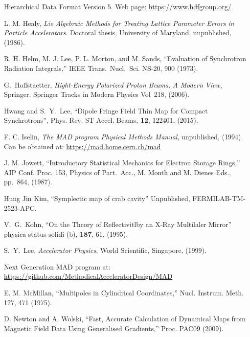 \begin{thebibliography}{XXXXXXX99}
Hierarchical Data Format Version 5. Web page:
\hfill\break
\hspace*{0.3in} \url{https://www.hdfgroup.org/}

L. M. Healy, {\it Lie Algebraic Methods for Treating Lattice Parameter
Errors in Particle Accelerators}. Doctoral thesis, University of
Maryland, unpublished, (1986).

R. H. Helm, M. J. Lee, P. L. Morton, and M. Sands, 
``Evaluation of Synchrotron Radiation Integrals,''
IEEE Trans.~Nucl.~Sci. NS-20, 900 (1973).

G.~Hoffstaetter, 
{\it Hight-Energy Polarized Proton Beams, A Modern View}, 
Springer. Springer Tracks in Modern Physics Vol~218, (2006).

Hwang and S.~Y.~Lee, 
``Dipole Fringe Field Thin Map for Compact Synchrotrons'',
Phys. Rev. ST Accel. Beams, {\bf 12}, 122401, (2015).

F. C. Iselin, 
{\it The MAD program Physical Methods Manual}, 
unpublished, (1994). Can be obtained at: 
\hfill\break
\hspace*{0.3in}
\url{https://mad.home.cern.ch/mad}

J. M. Jowett, 
``Introductory Statistical Mechanics for Electron Storage Rings,'' 
AIP Conf. Proc. 153, Physics of Part.\ Acc.,
M. Month and M. Dienes Eds., pp.~864, (1987).

Hung Jin Kim,
``Symplectic map of crab cavity''
Unpublished, FERMILAB-TM-2523-APC.

V.~G.~Kohn, 
``On the Thcory of Reflectivitlby an X-Ray Multilaler Mirror''
physica status solidi (b), {\bf 187}, 61, (1995).

S.~Y.~Lee,
{\it Accelerator Physics},
World Scientific, Singapore, (1999).

Next Generation MAD program at:
\hfill\break
\hspace*{0.3in}
\url{https://github.com/MethodicalAcceleratorDesign/MAD}

E. M. McMillan, 
``Multipoles in Cylindrical Coordinates,''
Nucl. Instrum. Meth. 127, 471 (1975).

D. Newton and A. Wolski, 
``Fast, Accurate Calculation of Dynamical Maps from
Magnetic Field Data Using Generalised Gradients,''
Proc. PAC09 (2009).


\end{thebibliography}
